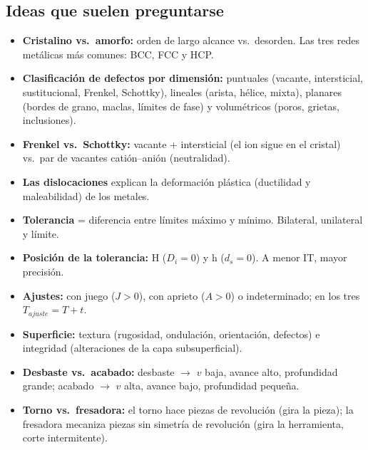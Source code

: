 \documentclass[12pt,a4paper]{article}
\begin{document}
\subsection{Ideas que suelen preguntarse}
\begin{itemize}
	\item \textbf{Cristalino vs.\ amorfo:} orden de largo alcance vs.\ desorden.
	      Las tres redes metálicas más comunes: BCC, FCC y HCP.
	\item \textbf{Clasificación de defectos por dimensión:} puntuales (vacante,
	      intersticial, sustitucional, Frenkel, Schottky), lineales (arista,
	      hélice,
	      mixta), planares (bordes de grano, maclas, límites de fase) y
	      volumétricos
	      (poros, grietas, inclusiones).
	\item \textbf{Frenkel vs.\ Schottky:} vacante + intersticial (el ion sigue en
	      el cristal) vs.\ par de vacantes catión--anión (neutralidad).
	\item \textbf{Las dislocaciones} explican la deformación plástica (ductilidad
	      y maleabilidad) de los metales.
	\item \textbf{Tolerancia} = diferencia entre límites máximo y mínimo.
	      Bilateral, unilateral y límite.
	\item \textbf{Posición de la tolerancia:} H ($D_i = 0$) y h ($d_s = 0$). A
	      menor IT, mayor precisión.
	\item \textbf{Ajustes:} con juego ($J>0$), con aprieto ($A>0$) o
	      indeterminado; en los tres $T_{ajuste} = T + t$.
	\item \textbf{Superficie:} textura (rugosidad, ondulación, orientación,
	      defectos) e integridad (alteraciones de la capa subsuperficial).
	\item \textbf{Desbaste vs.\ acabado:} desbaste $\to$ $v$ baja, avance alto,
	      profundidad grande; acabado $\to$ $v$ alta, avance bajo, profundidad
	      pequeña.
	\item \textbf{Torno vs.\ fresadora:} el torno hace piezas de revolución (gira
	      la pieza); la fresadora mecaniza piezas sin simetría de revolución (gira
	      la
	      herramienta, corte intermitente).
\end{itemize}
\end{document}
